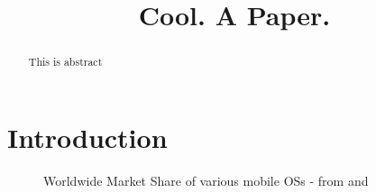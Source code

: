 \documentclass{acm_proc_article-sp}
\begin{document}
\title{Cool. A Paper.}
%
%
%
%
%




\maketitle
\begin{abstract}
This is abstract
\end{abstract}




\section{Introduction}

\begin{figure}[h]
\begin{center}
\caption{Worldwide Market Share of various mobile OSs - from \citep{wikimobileshare} and \citep{gartnerq42012}}
\label{fig:mobileshares}
\end{center}
\end{figure}
\end{document}
